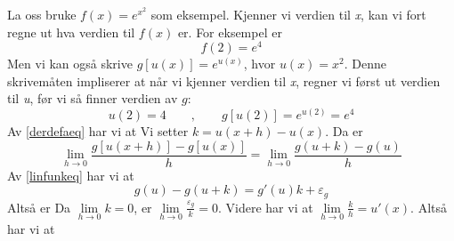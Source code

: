 La oss bruke $f(x) =e^{x^2} $ som eksempel. Kjenner vi verdien til \textit{x}, kan vi fort regne ut hva verdien til $ f(x) $ er. For eksempel er
\[ f(2)=e^4 \]
Men vi kan også skrive $ {g\left[u(x)\right]=e^{u(x)}} $, hvor $ u(x)=x^2 $. Denne skrivemåten impliserer at når vi kjenner verdien til \textit{x}, regner vi først ut verdien til \textit{u}, før vi så finner verdien av $g$: 
\[ u(2) =4\qquad,\qquad 
g\left[u(2)\right]=e^{u(2)}=e^4 \]
Av \eqref{derdefaeq} har vi at
Vi setter $ k = u(x+h)-u(x) $. Da er
\[ \lim\limits_{h \to 0}\frac{g\left[u(x+h)\right]-g\left[u(x)\right]}{h}= \lim\limits_{h \to 0}\frac{g(u+k)-g(u)}{h} \]
Av \eqref{linfunkeq} har vi at
\[ g(u)-g(u+k)= g'(u)k+\varepsilon_g  \]
Altså er
Da $ \lim\limits_{h\to0}k=0 $, er $ \lim\limits_{h\to0}\frac{\varepsilon_g}{k}=0 $. Videre har vi at $ \lim\limits_{h\to0}\frac{k}{h}=u'(x) $. Altså har vi at
\regv
{}
